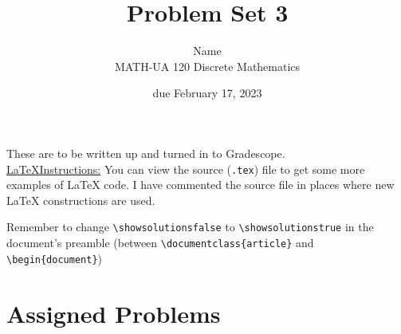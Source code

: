 \documentclass{article}
\title{Problem Set 3}
\author{%
    Name
\\  MATH-UA 120 Discrete Mathematics
}
\date{due February 17, 2023}
\newif\ifshowsolutions
\newcommand{\danger}{\marginpar[\hfill\dbend]{\dbend\hfill}}
\theoremstyle{definition}
\begin{document}
\maketitle



These are to be written up and turned in to Gradescope.\\



\ifshowsolutions
    \SetupExSheets{solution/print=true}
\else
    \danger
 \underline{ \LaTeX  Instructions:}  You can view the source (\texttt{.tex}) file to get some more examples of \LaTeX{} code.  I have commented the source file in places where new \LaTeX{} constructions are used.
  
  Remember to change \verb|\showsolutionsfalse| to \verb|\showsolutionstrue|
    in the document's preamble 
    (between \verb|\documentclass{article}| and \verb|\begin{document}|)
\fi

\section*{Assigned Problems}
\end{document}
